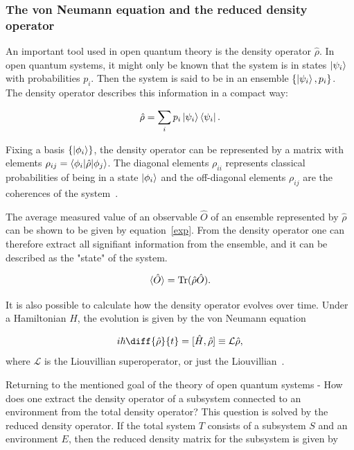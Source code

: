 \documentclass[../main.tex]{subfiles}
\begin{document}
\subsubsection{The von Neumann equation and the reduced density operator}

An important tool used in open quantum theory is the density operator $\hat{\rho}$. In open quantum systems, it might only be known that the system is in states $\ket{\psi_i}$ with probabilities $p_i$. Then the system is said to be in an ensemble $\{\ket{\psi_i}, p_i\}$. The density operator describes this information in a compact way:

\begin{equation}
    \hat{\rho} = \sum_i p_i \ket{\psi_i}\bra{\psi_i}.
\end{equation}

Fixing a basis $\{\ket{\phi_i}\}$, the density operator can be represented by a matrix with elements $\rho_{ij} = \braket{\phi_i|\hat\rho|\phi_j}$. The diagonal elements $\rho_{ii}$ represents classical probabilities of being in a state $\ket{\phi_i}$ and the off-diagonal elements $\rho_{ij}$ are the coherences of the system~\cite{bookopen}.

The average measured value of an observable $\hat O$ of an ensemble represented by $\hat\rho$ can be shown to be given by equation~\eqref{exp}. From the density operator one can therefore extract all signifiant information from the ensemble, and it can be described as the "state" of the system.

\begin{equation}\label{exp}
    \braket{\hat O} = \operatorname{Tr}({\hat\rho \hat O}).
\end{equation}

It is also possible to calculate how the density operator evolves over time. Under a Hamiltonian $\hat H$, the evolution is given by the von Neumann equation

\begin{equation}\label{vonneumann}
    i\hbar\diff{\hat\rho}{t} = [\hat H, \hat\rho] \equiv \mathcal{L}\hat\rho,
\end{equation}
where $\mathcal{L}$ is the Liouvillian superoperator, or just the Liouvillian~\cite{bookopen}. 

Returning to the mentioned goal of the theory of open quantum systems - How does one extract the density operator of a subsystem connected to an environment from the total density operator? This question is solved by the reduced density operator. If the total system $T$ consists of a subsystem $S$ and an environment $E$, then the reduced density matrix for the subsystem is given by
\end{document}
